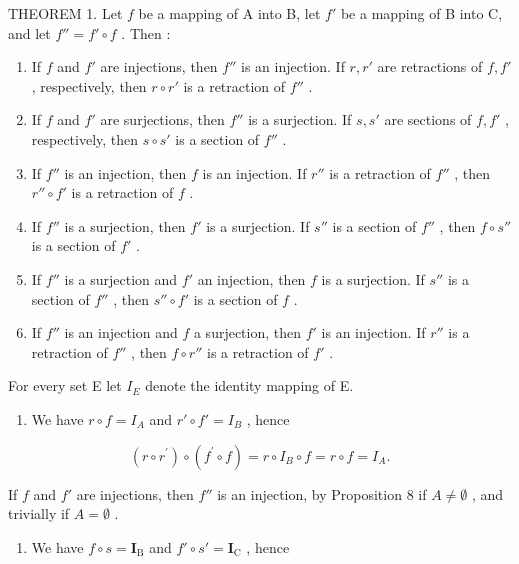THEOREM 1. Let \(f\) be a mapping of A into B, let \(f'\) be a mapping of B into C, and let \(f'' = f' \circ f\) . Then :

\begin{enumerate}
\def\labelenumi{(\alph{enumi})}
\item
  If \(f\) and \(f'\) are injections, then \(f''\) is an injection. If \(r, r'\) are retractions of \(f, f'\) , respectively, then \(r \circ r'\) is a retraction of \(f''\) .
\item
  If \(f\) and \(f'\) are surjections, then \(f''\) is a surjection. If \(s, s'\) are sections of \(f, f'\) , respectively, then \(s \circ s'\) is a section of \(f''\) .
\item
  If \(f''\) is an injection, then \(f\) is an injection. If \(r''\) is a retraction of \(f''\) , then \(r'' \circ f'\) is a retraction of \(f\) .
\item
  If \(f''\) is a surjection, then \(f'\) is a surjection. If \(s''\) is a section of \(f''\) , then \(f \circ s''\) is a section of \(f'\) .
\item
  If \(f''\) is a surjection and \(f'\) an injection, then \(f\) is a surjection. If \(s''\) is a section of \(f''\) , then \(s'' \circ f'\) is a section of \(f\) .
\item
  If \(f''\) is an injection and \(f\) a surjection, then \(f'\) is an injection. If \(r''\) is a retraction of \(f''\) , then \(f \circ r''\) is a retraction of \(f'\) .
\end{enumerate}

For every set E let \(I_{E}\) denote the identity mapping of E.

\begin{enumerate}
\def\labelenumi{(\alph{enumi})}
\tightlist
\item
  We have \(r \circ f = I_A\) and \(r' \circ f' = I_B\) , hence
\end{enumerate}

\[
\left(r \circ r ^ {\prime}\right) \circ \left(f ^ {\prime} \circ f\right) = r \circ I _ {B} \circ f = r \circ f = I _ {A}.
\]

If \(f\) and \(f'\) are injections, then \(f''\) is an injection, by Proposition 8 if \(A \neq \emptyset\) , and trivially if \(A = \emptyset\) .

\begin{enumerate}
\def\labelenumi{(\alph{enumi})}
\setcounter{enumi}{1}
\tightlist
\item
  We have \(f \circ s = \mathbf{I}_{\mathrm{B}}\) and \(f' \circ s' = \mathbf{I}_{\mathrm{C}}\) , hence
\end{enumerate}

